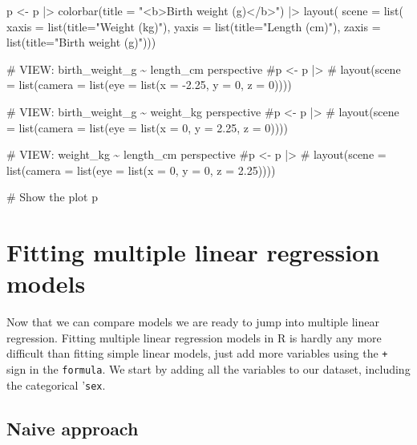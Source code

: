 \documentclass[
  letterpaper,
  DIV=11,
  numbers=noendperiod]{scrreprt}
\newenvironment{Shaded}{\begin{snugshade}}{\end{snugshade}}
\newcommand{\AttributeTok}[1]{\textcolor[rgb]{0.40,0.45,0.13}{#1}}
\newcommand{\CommentTok}[1]{\textcolor[rgb]{0.37,0.37,0.37}{#1}}
\newcommand{\FunctionTok}[1]{\textcolor[rgb]{0.28,0.35,0.67}{#1}}
\newcommand{\NormalTok}[1]{\textcolor[rgb]{0.00,0.23,0.31}{#1}}
\newcommand{\OtherTok}[1]{\textcolor[rgb]{0.00,0.23,0.31}{#1}}
\newcommand{\SpecialCharTok}[1]{\textcolor[rgb]{0.37,0.37,0.37}{#1}}
\newcommand{\StringTok}[1]{\textcolor[rgb]{0.13,0.47,0.30}{#1}}
\begin{document}
\begin{Shaded}
\begin{Highlighting}[]
\NormalTok{p }\OtherTok{\textless{}{-}}\NormalTok{ p }\SpecialCharTok{|\textgreater{}} 
  \FunctionTok{colorbar}\NormalTok{(}\AttributeTok{title =} \StringTok{"\textless{}b\textgreater{}Birth weight (g)\textless{}/b\textgreater{}"}\NormalTok{) }\SpecialCharTok{|\textgreater{}}
  \FunctionTok{layout}\NormalTok{(}
    \AttributeTok{scene =} \FunctionTok{list}\NormalTok{(}
      \AttributeTok{xaxis =} \FunctionTok{list}\NormalTok{(}\AttributeTok{title=}\StringTok{"Weight (kg)"}\NormalTok{), }
      \AttributeTok{yaxis =} \FunctionTok{list}\NormalTok{(}\AttributeTok{title=}\StringTok{"Length (cm)"}\NormalTok{),}
      \AttributeTok{zaxis =} \FunctionTok{list}\NormalTok{(}\AttributeTok{title=}\StringTok{"Birth weight (g)"}\NormalTok{)))}

\CommentTok{\# VIEW: birth\_weight\_g \textasciitilde{} length\_cm perspective}
\CommentTok{\#p \textless{}{-} p |\textgreater{} }
\CommentTok{\#  layout(scene = list(camera = list(eye = list(x = {-}2.25, y = 0, z = 0))))}

\CommentTok{\# VIEW: birth\_weight\_g \textasciitilde{} weight\_kg perspective}
\CommentTok{\#p \textless{}{-} p |\textgreater{} }
\CommentTok{\#  layout(scene = list(camera = list(eye = list(x = 0, y = 2.25, z = 0))))}

\CommentTok{\# VIEW: weight\_kg \textasciitilde{} length\_cm perspective}
\CommentTok{\#p \textless{}{-} p |\textgreater{} }
\CommentTok{\#  layout(scene = list(camera = list(eye = list(x = 0, y = 0, z = 2.25))))}

\CommentTok{\# Show the plot}
\NormalTok{p}
\end{Highlighting}
\end{Shaded}

\section{Fitting multiple linear regression
models}\label{fitting-multiple-linear-regression-models}

Now that we can compare models we are ready to jump into multiple linear
regression. Fitting multiple linear regression models in R is hardly any
more difficult than fitting simple linear models, just add more
variables using the \texttt{+} sign in the \texttt{formula}. We start by
adding all the variables to our dataset, including the categorical
'\texttt{sex}.

\subsection{Naive approach}\label{naive-approach}
\end{document}
